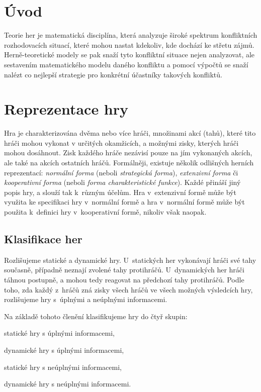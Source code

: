 \documentclass[12pt,a5paper]{article}
\begin{document}
\section*{Úvod}
Teorie her je matematická disciplína, která analyzuje široké spektrum konfliktních rozhodovacích situací, které mohou nastat kdekoliv, kde dochází ke střetu zájmů. Herně-teoretické modely se pak snaží tyto konfliktní situace nejen analyzovat, ale sestavením matematického modelu daného konfliktu a pomocí výpočtů se snaží nalézt co nejlepší strategie pro konkrétní účastníky takových konfliktů.

\section{Reprezentace hry}
Hra je charakterizována dvěma nebo více hráči, množinami akcí (tahů), které tito hráči mohou vykonat v určitých okamžicích, a možnými zisky, kterých hráči mohou dosáhnout. Zisk každého hráče nezávisí pouze na jím vykonaných akcích, ale také na akcích ostatních hráčů. Formálněji, existuje několik odlišných herních reprezentací: \emph{normální forma} (neboli \emph{strategická forma}), \emph{extenzivní forma} či \emph{kooperativní forma} (neboli \emph{forma charakteristické funkce}). Každé přináší jiný popis hry, a slouží tak k~různým účelům. Hra v~extenzivní formě může být využita ke specifikaci hry v~normální formě a hra v~normální formě může být použita k~definici hry v~kooperativní formě, nikoliv však naopak.

\subsection{Klasifikace her}
Rozlišujeme statické a dynamické hry. U~statických her vykonávají hráči své tahy současně, případně neznají zvolené tahy protihráčů. U~dynamických her hráči táhnou postupně, a mohou tedy reagovat na předchozí tahy protihráčů. Podle toho, zda každý z~hráčů zná zisky všech hráčů ve všech možných výsledcích hry, rozlišujeme hry s~úplnými a neúplnými informacemi.
   
Na základě tohoto členění klasifikujeme hry do čtyř skupin:
\begin{compactitem}
\item statické hry s úplnými informacemi,
\item dynamické hry s úplnými informacemi,
\item statické hry s neúplnými informacemi,
\item dynamické hry s neúplnými informacemi.
\end{compactitem}
\end{document}
